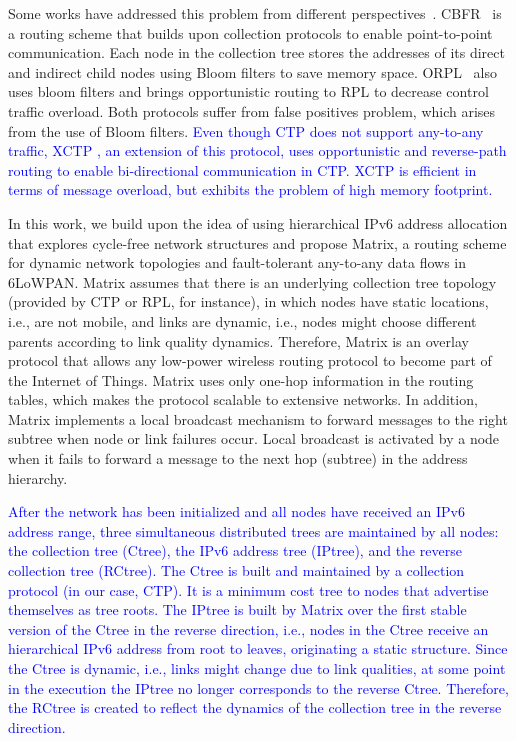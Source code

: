 Some works have addressed this problem from different perspectives~\cite{Rein12, Duque13, xctp}. CBFR~\cite{Rein12} is a routing scheme that builds upon collection protocols to enable point-to-point communication. Each node in the collection tree stores the addresses of its direct and indirect child nodes using Bloom filters to save memory space. ORPL~\cite{Duque13} also uses bloom filters and brings opportunistic routing to RPL to decrease control traffic overload. Both protocols suffer from false positives problem, which arises from the use of Bloom filters. \textcolor{blue}{Even though CTP does not support any-to-any traffic, XCTP \cite{xctp}, an extension of this protocol, uses opportunistic and reverse-path routing to enable bi-directional communication in CTP. XCTP is efficient in terms of message overload, but exhibits the problem of high memory footprint.}

In this work, we build upon the idea of using hierarchical IPv6 address allocation that
explores cycle-free network structures and propose Matrix, a routing scheme for dynamic network topologies and fault-tolerant any-to-any data flows in 6LoWPAN. Matrix assumes that there is an underlying collection tree topology (provided by CTP or RPL, for instance), in which nodes have static locations, i.e., are not mobile, and links are dynamic, i.e., nodes might choose different parents according to link quality dynamics. Therefore, Matrix is an overlay protocol that allows any low-power wireless routing protocol to become part of the Internet of Things. Matrix uses only one-hop information in the routing tables, which makes the protocol scalable to extensive networks. In addition, Matrix implements a local broadcast mechanism to forward messages to the right subtree when node or link failures occur. Local broadcast is activated by a node when it fails to forward a message to the next hop (subtree) in the address hierarchy.

\textcolor{blue}{After the network has been initialized and all nodes have received an IPv6 address range, three simultaneous distributed trees are maintained by all nodes: the collection tree (Ctree), the IPv6 address tree (IPtree), and the reverse collection tree (RCtree). The Ctree is built and maintained by a collection protocol (in our case, CTP). It is a minimum cost tree to nodes that advertise themselves as tree roots. The IPtree is built by Matrix over the first stable version of the Ctree in the reverse direction, i.e., nodes in the Ctree receive an hierarchical IPv6 address from root to leaves, originating a static structure. Since the Ctree is dynamic, i.e., links might change due to link qualities, at some point in the execution the IPtree no longer corresponds to the reverse Ctree. Therefore, the RCtree is created to reflect the dynamics of the collection tree in the reverse direction.}

